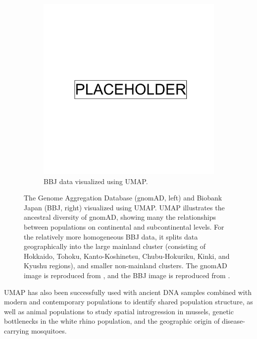 \begin{figure}[h!]
  \begin{subfigure}[b]{0.4\linewidth}
    \includegraphics[width=\linewidth]{placeholder.png}
    \caption{BBJ data visualized using UMAP.}
    \label{fig:BBJ_UMAP}
  \end{subfigure}
  \caption[UMAP of gnomAD and Biobank Japan]{The Genome Aggregation Database (gnomAD, left) and Biobank Japan (BBJ, right) visualized using UMAP. UMAP illustrates the ancestral diversity of gnomAD, showing many the relationships between populations on continental and subcontinental levels. For the relatively more homogeneous BBJ data, it splits data geographically into the large mainland cluster (consisting of Hokkaido, Tohoku, Kanto-Koshinetsu, Chubu-Hokuriku, Kinki, and Kyushu regions), and smaller non-mainland clusters. The gnomAD image is reproduced from \citep{karczewski_mutational_2020}, and the BBJ image is reproduced from \citep{sakaue_dimensionality_2020}.
  }
  \label{fig:external_UMAP}
\end{figure}

\clearpage

UMAP has also been successfully used with ancient DNA samples combined with modern and contemporary populations to identify shared population structure\citep{margaryan_population_2019}, as well as animal populations to study spatial introgression in mussels\citep{simon_local_2019}, genetic bottlenecks in the white rhino population\citep{sanchez-barreiro_historical_2020}, and the geographic origin of disease-carrying mosquitoes\citep{consortium_genome_2020}\citep{schmidt2020population}. 

